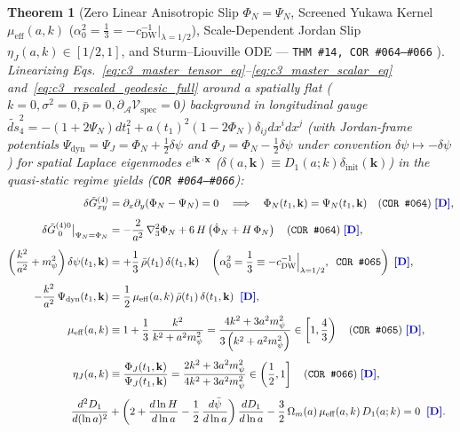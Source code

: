\documentclass[11pt,a4paper]{article}
\newcommand{\catD}{\text{\textbf{\textcolor{blue!75!black}{[D]}}}}
\theoremstyle{definition}
\theoremstyle{plain}
\newtheorem{theorem}[axiom]{Theorem}
\theoremstyle{remark}
\begin{document}
\begin{theorem}[{Zero Linear Anisotropic Slip $\Phi_N = \Psi_N$, Screened Yukawa Kernel $\mu_{\mathrm{eff}}(a,k)$ ($\alpha_0^2 = \frac{1}{3} = -c_{\mathrm{DW}}^{-1}\big|_{\lambda=1/2}$), Scale-Dependent Jordan Slip $\eta_J(a,k) \in [1/2, 1]$, and Sturm--Liouville ODE --- \texttt{THM~\#14, COR~\#064--\#066} \catD}]\label{thm:c5_sturm_liouville_d1_thm}\label{thm:c5_sturm_liouville_perturbation}
Linearizing Eqs.~\eqref{eq:c3_master_tensor_eq}--\eqref{eq:c3_master_scalar_eq} and~\eqref{eq:c3_rescaled_geodesic_full} around a spatially flat ($k=0, \sigma^2=0, \bar{p}=0, \partial_{\mathcal{A}}\mathcal{V}_{\mathrm{spec}}=0$) background in longitudinal gauge $\widetilde{ds}_4^2 = -(1 + 2\Psi_N)dt_1^2 + a(t_1)^2(1 - 2\Phi_N)\delta_{ij}dx^i dx^j$ (with Jordan-frame potentials $\Psi_{\mathrm{dyn}} = \Psi_J = \Phi_N + \frac{1}{2}\delta\psi$ and $\Phi_J = \Phi_N - \frac{1}{2}\delta\psi$ under convention $\delta\psi \mapsto -\delta\psi$) for spatial Laplace eigenmodes $e^{i\mathbf{k}\cdot\mathbf{x}}$ ($\delta(a, \mathbf{k}) \equiv D_1(a; k)\delta_{\mathrm{init}}(\mathbf{k})$) in the quasi-static regime yields (\texttt{COR~\#064--\#066}):
\begin{align}
\delta\tilde{G}^{(4)}_{xy} &= \partial_x\partial_y\!\left(\Phi_N - \Psi_N\right) = 0 \quad \Longrightarrow \quad
\Phi_N(t_1, \mathbf{k}) = \Psi_N(t_1, \mathbf{k}) \quad \textnormal{(\texttt{COR~\#064})} \;\catD, \label{eq:c5_no_slip_identity} \\[4pt]
\delta\tilde{G}^{(4)0}_{\;0}\big|_{\Psi_N=\Phi_N} &= -\frac{2}{a^2}\,\nabla_3^2\Phi_N + 6\,H\left(\dot{\Phi}_N + H\,\Phi_N\right) \quad \textnormal{(\texttt{COR~\#064})} \;\catD, \nonumber \\[4pt]
\left(\frac{k^2}{a^2} + m_\psi^2\right)\delta\psi(t_1, \mathbf{k}) &= +\frac{1}{3}\,\bar{\rho}(t_1)\,\delta(t_1, \mathbf{k}) \quad \left(\alpha_0^2 = \frac{1}{3} \equiv -c_{\mathrm{DW}}^{-1}\Big|_{\lambda=1/2}, \;\; \textnormal{\texttt{COR~\#065}}\right) \;\catD, \label{eq:c5_helmholtz_deltapsi} \\[4pt]
-\frac{k^2}{a^2}\,\Psi_{\mathrm{dyn}}(t_1, \mathbf{k}) &= \frac{1}{2}\,\mu_{\mathrm{eff}}(a, k)\,\bar{\rho}(t_1)\,\delta(t_1, \mathbf{k}) \;\;\catD, \label{eq:c5_effective_poisson_eq} \\[4pt]
\mu_{\mathrm{eff}}(a, k) &\equiv 1 + \frac{1}{3}\,\frac{k^2}{k^2 + a^2 m_\psi^2} = \frac{4k^2 + 3a^2 m_\psi^2}{3\left(k^2 + a^2 m_\psi^2\right)} \in \left[1, \frac{4}{3}\right) \quad \textnormal{(\texttt{COR~\#065})} \;\catD, \label{eq:c5_effective_poisson_kernel} \\[4pt]
\eta_J(a, k) &\equiv \frac{\Phi_J(t_1, \mathbf{k})}{\Psi_J(t_1, \mathbf{k})} = \frac{2k^2 + 3a^2 m_\psi^2}{4k^2 + 3a^2 m_\psi^2} \in \left(\frac{1}{2}, 1\right] \quad \textnormal{(\texttt{COR~\#066})} \;\catD, \label{eq:c5_jordan_slip_kernel} \\[4pt]
\frac{d^2 D_1}{d(\ln a)^2} &+ \left(2 + \frac{d\ln H}{d\ln a} - \frac{1}{2}\,\frac{d\bar{\psi}}{d\ln a}\right)\frac{d D_1}{d\ln a} - \frac{3}{2}\,\Omega_m(a)\,\mu_{\mathrm{eff}}(a, k)\,D_1(a; k) = 0 \;\;\catD. \label{eq:c5_sturm_liouville_d1}
\end{align}
\end{theorem}
\end{document}
